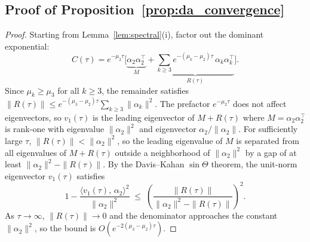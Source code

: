 \documentclass{article}
\begin{document}
\subsection{Proof of Proposition~\ref{prop:da_convergence}}
\label{app:da_convergence_proof}
\begin{proof}
Starting from Lemma~\ref{lem:spectral}(i), factor out the dominant exponential:
\[
C(\tau) = e^{-\mu_2 \tau}\bigg[\underbrace{\alpha_2 \alpha_2^\top}_{M} + \underbrace{\sum_{k \geq 3} e^{-(\mu_k - \mu_2)\tau}\, \alpha_k \alpha_k^\top}_{R(\tau)}\bigg].
\]
Since $\mu_k \geq \mu_3$ for all $k \geq 3$, the remainder satisfies $\|R(\tau)\| \leq e^{-(\mu_3 - \mu_2)\tau} \sum_{k \geq 3} \|\alpha_k\|^2$. The prefactor $e^{-\mu_2 \tau}$ does not affect eigenvectors, so $v_1(\tau)$ is the leading eigenvector of $M + R(\tau)$ where $M = \alpha_2 \alpha_2^\top$ is rank-one with eigenvalue $\|\alpha_2\|^2$ and eigenvector $\alpha_2/\|\alpha_2\|$. For sufficiently large $\tau$, $\|R(\tau)\| < \|\alpha_2\|^2$, so the leading eigenvalue of $M$ is separated from all eigenvalues of $M + R(\tau)$ outside a neighborhood of $\|\alpha_2\|^2$ by a gap of at least $\|\alpha_2\|^2 - \|R(\tau)\|$. By the Davis--Kahan $\sin\Theta$ theorem, the unit-norm eigenvector $v_1(\tau)$ satisfies
\[
1 - \frac{\langle v_1(\tau),\, \alpha_2\rangle^2}{\|\alpha_2\|^2} \;\leq\; \left(\frac{\|R(\tau)\|}{\|\alpha_2\|^2 - \|R(\tau)\|}\right)^2.
\]
As $\tau \to \infty$, $\|R(\tau)\| \to 0$ and the denominator approaches the constant $\|\alpha_2\|^2$, so the bound is $O(e^{-2(\mu_3 - \mu_2)\tau})$.


\end{proof}
\end{document}
